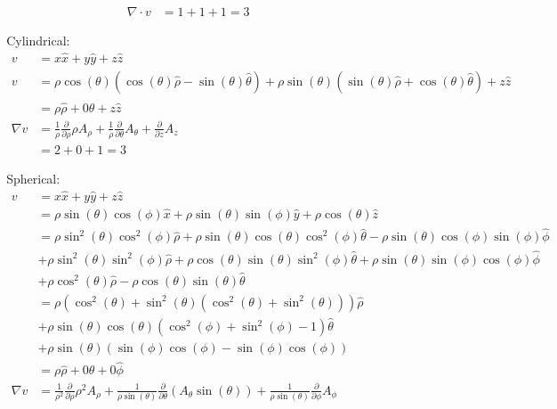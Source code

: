 \documentclass{article}
\begin{document}
\begin{itemize}
\begin{itemize}
\begin{itemize}
\begin{itemize}
                \begin{align*}
                    \nabla \cdot v&= 1+1+1=3
                \end{align*}
                \item [Cylindrical:]
                \begin{align*}
                    v&=x\hat{x}+y\hat{y}+z\hat{z}\\
                    v&=\rho \cos(\theta)(\cos(\theta)\hat\rho-\sin(\theta)\hat\theta)+\rho \sin(\theta)(\sin(\theta)\hat\rho+\cos(\theta)\hat\theta)+z\hat z\\
                    &=\rho \hat\rho+0\hat\theta+z\hat z\\
                    \nabla v &=\frac{1}{\rho}\frac{\partial}{\partial \rho}\rho A_\rho+\frac{1}{\rho}\frac{\partial}{\partial \theta}A_\theta+\frac{\partial}{\partial z}A_z\\
                    &=2+0+1=3
                \end{align*}
                \item [Spherical:]
                \begin{align*}
                    v&=x\hat{x}+y\hat{y}+z\hat{z}\\
                    &=\rho \sin(\theta)\cos(\phi)\hat x+\rho \sin(\theta)\sin(\phi)\hat y+\rho\cos(\theta)\hat{z}\\
                    &=\rho\sin^2(\theta)\cos^2(\phi)\hat \rho+\rho\sin(\theta)\cos(\theta)\cos^2(\phi)\hat\theta-\rho\sin(\theta)\cos(\phi)\sin(\phi)\hat\phi\\
                    &+\rho \sin^2(\theta)\sin^2(\phi)\hat \rho+\rho\cos(\theta)\sin(\theta)\sin^2(\phi)\hat\theta+\rho \sin(\theta)\sin(\phi)\cos(\phi)\hat\phi\\
                    &+\rho\cos^2(\theta)\hat\rho-\rho\cos(\theta)\sin(\theta)\hat\theta\\
                    &=\rho(\cos^2(\theta)+\sin^2(\theta)(\cos^2(\theta)+\sin^2(\theta)))\hat{\rho}\\
                    &+\rho\sin(\theta)\cos(\theta)(\cos^2(\phi)+\sin^2(\phi)-1)\hat\theta\\
                    &+\rho\sin(\theta)(\sin(\phi)\cos(\phi)-\sin(\phi)\cos(\phi))\\
                    &=\rho\hat\rho+0\hat\theta+0\hat\phi\\
                    \nabla v&=\frac{1}{\rho^2}\frac{\partial}{\partial \rho}\rho^2 A_\rho+\frac{1}{\rho\sin(\theta)}\frac{\partial}{\partial \theta}(A_\theta\sin(\theta))+\frac{1}{\rho\sin(\theta)}\frac{\partial}{\partial \phi}A_\phi\\

\end{align*}
\end{itemize}
\end{itemize}
\end{itemize}
\end{itemize}
\end{document}
